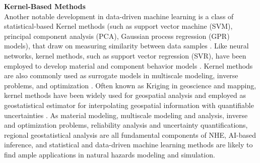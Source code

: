 \noindent\textbf{Kernel-Based Methods} \\Another notable development in data-driven machine learning is a class of statistical-based Kernel methods (such as support vector machine (SVM), principal component analysis (PCA), Gaussian process regression (GPR) models), that draw on measuring similarity between data samples \citep{rasmussen2006gaussian,hofmann2008kernel}. Like neural networks, kernel methods, such as support vector regression (SVR), have been employed to develop material and component behavior models \citep[see, e.g.][]{luo2018machine}. Kernel methods are also commonly used as surrogate models in multiscale modeling, inverse problems, and optimization \citep{wirtz2012surrogate, park2016bayesian, eriksson2018scalable, santin2019kernel}. Often known as Kriging in geoscience and mapping, kernel methods have been widely used for geospatial analysis and employed as geostatistical estimator for interpolating geospatial information with quantifiable uncertainties \citep{olea2012geostatistics,jia2016surrogate}. As material modeling, multiscale modeling and analysis, inverse and optimization problems, reliability analysis and uncertainty quantifications, regional geostatistical analysis are all fundamental components of NHE, AI-based inference, and statistical and data-driven machine learning methods are likely to find ample applications in natural hazards modeling and simulation. 
\newline

